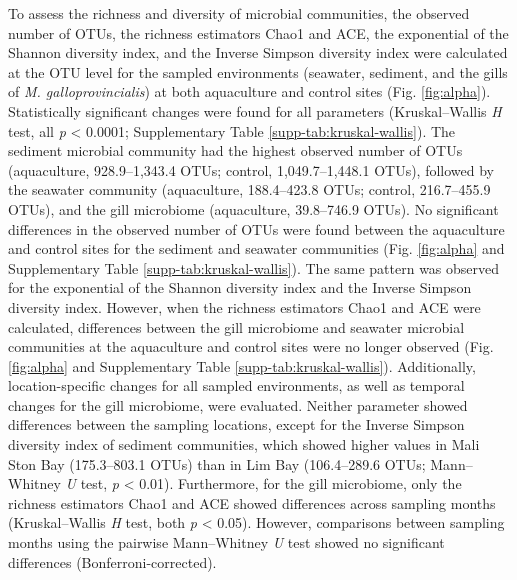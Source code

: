 \documentclass[
  12 pt,
]{article}
\begin{document}
To assess the richness and diversity of microbial communities, the observed number of OTUs, the richness estimators Chao1 and ACE, the exponential of the Shannon diversity index, and the Inverse Simpson diversity index were calculated at the OTU level for the sampled environments (seawater, sediment, and the gills of \emph{M. galloprovincialis}) at both aquaculture and control sites (Fig. \ref{fig:alpha}). Statistically significant changes were found for all parameters (Kruskal--Wallis \emph{H} test, all \emph{p} \textless{} 0.0001; Supplementary Table \ref{supp-tab:kruskal-wallis}). The sediment microbial community had the highest observed number of OTUs (aquaculture, 928.9--1,343.4 OTUs; control, 1,049.7--1,448.1 OTUs), followed by the seawater community (aquaculture, 188.4--423.8 OTUs; control, 216.7--455.9 OTUs), and the gill microbiome (aquaculture, 39.8--746.9 OTUs). No significant differences in the observed number of OTUs were found between the aquaculture and control sites for the sediment and seawater communities (Fig. \ref{fig:alpha} and Supplementary Table \ref{supp-tab:kruskal-wallis}). The same pattern was observed for the exponential of the Shannon diversity index and the Inverse Simpson diversity index. However, when the richness estimators Chao1 and ACE were calculated, differences between the gill microbiome and seawater microbial communities at the aquaculture and control sites were no longer observed (Fig. \ref{fig:alpha} and Supplementary Table \ref{supp-tab:kruskal-wallis}). Additionally, location-specific changes for all sampled environments, as well as temporal changes for the gill microbiome, were evaluated. Neither parameter showed differences between the sampling locations, except for the Inverse Simpson diversity index of sediment communities, which showed higher values in Mali Ston Bay (175.3--803.1 OTUs) than in Lim Bay (106.4--289.6 OTUs; Mann--Whitney \emph{U} test, \emph{p} \textless{} 0.01). Furthermore, for the gill microbiome, only the richness estimators Chao1 and ACE showed differences across sampling months (Kruskal--Wallis \emph{H} test, both \emph{p} \textless{} 0.05). However, comparisons between sampling months using the pairwise Mann--Whitney \emph{U} test showed no significant differences (Bonferroni-corrected).
\end{document}
